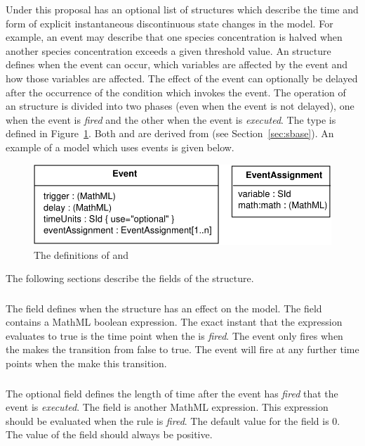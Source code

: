 \documentclass[10pt,twocolumntoc]{cekarticle}
\newcommand{\vref}[1]{\ref{#1}}
\begin{document}
Under this proposal  has an optional list of  structures which describe the time and form of explicit instantaneous discontinuous state changes in the model.  For example, an event may describe that one species concentration is halved when another species concentration exceeds a given threshold value.  An  structure defines when the event can occur, which variables are affected by the event and how those variables are affected. The effect of the event can optionally be delayed after the occurrence of the condition which invokes the event. The operation of an  structure is divided into two phases (even when the event is not delayed), one when the event is \emph{fired} and the other when the event is \emph{executed}. The  type is defined in Figure~\vref{fig:event}.  Both  and  are derived from  (see Section~\ref{sec:sbase}).  An example of a model which uses events is given below.

\begin{figure}[htb]
  \centering
  \includegraphics[scale = 0.68]{event}
  \caption{The definitions of  and }
  \label{fig:event}
\end{figure}

The following sections describe the fields of the 
structure.

\subsubsection{}
The  field defines when the 
structure has an effect on the model.  The  field
contains a MathML boolean expression.  The exact instant that the
expression evaluates to true is the time point when the
 is \emph{fired}.  The event only fires when the
 makes the transition from false to true.  The
event will fire at any further time points when the
 make this transition.

\subsubsection{}
The optional  field defines the length of time after
the event has \emph{fired} that the event is \emph{executed}. The
 field is another MathML expression.  This
expression should be evaluated when the rule is \emph{fired}.  The
default value for the  field is 0.  The value of the
 field should always be positive.
\end{document}
